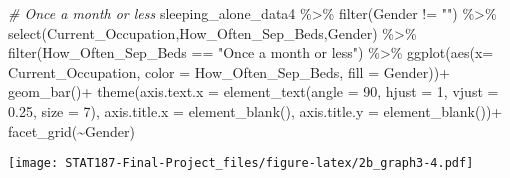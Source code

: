 \documentclass[
]{article}
\newenvironment{Shaded}{\begin{snugshade}}{\end{snugshade}}
\newcommand{\AttributeTok}[1]{\textcolor[rgb]{0.77,0.63,0.00}{#1}}
\newcommand{\CommentTok}[1]{\textcolor[rgb]{0.56,0.35,0.01}{\textit{#1}}}
\newcommand{\DecValTok}[1]{\textcolor[rgb]{0.00,0.00,0.81}{#1}}
\newcommand{\FloatTok}[1]{\textcolor[rgb]{0.00,0.00,0.81}{#1}}
\newcommand{\FunctionTok}[1]{\textcolor[rgb]{0.00,0.00,0.00}{#1}}
\newcommand{\NormalTok}[1]{#1}
\newcommand{\SpecialCharTok}[1]{\textcolor[rgb]{0.00,0.00,0.00}{#1}}
\newcommand{\StringTok}[1]{\textcolor[rgb]{0.31,0.60,0.02}{#1}}
\begin{document}
\begin{Shaded}
\begin{Highlighting}[]
\CommentTok{\# Once a month or less}
\NormalTok{sleeping\_alone\_data4 }\SpecialCharTok{\%\textgreater{}\%} \FunctionTok{filter}\NormalTok{(Gender }\SpecialCharTok{!=} \StringTok{""}\NormalTok{) }\SpecialCharTok{\%\textgreater{}\%}
  \FunctionTok{select}\NormalTok{(Current\_Occupation,How\_Often\_Sep\_Beds,Gender) }\SpecialCharTok{\%\textgreater{}\%}
  \FunctionTok{filter}\NormalTok{(How\_Often\_Sep\_Beds }\SpecialCharTok{==} \StringTok{"Once a month or less"}\NormalTok{) }\SpecialCharTok{\%\textgreater{}\%}
  \FunctionTok{ggplot}\NormalTok{(}\FunctionTok{aes}\NormalTok{(}\AttributeTok{x=}\NormalTok{ Current\_Occupation,}
             \AttributeTok{color =}\NormalTok{ How\_Often\_Sep\_Beds,}
             \AttributeTok{fill =}\NormalTok{ Gender))}\SpecialCharTok{+}
  \FunctionTok{geom\_bar}\NormalTok{()}\SpecialCharTok{+}
  \FunctionTok{theme}\NormalTok{(}\AttributeTok{axis.text.x =} \FunctionTok{element\_text}\NormalTok{(}\AttributeTok{angle =} \DecValTok{90}\NormalTok{,}
                                   \AttributeTok{hjust =} \DecValTok{1}\NormalTok{,}
                                   \AttributeTok{vjust =} \FloatTok{0.25}\NormalTok{,}
                                   \AttributeTok{size =} \DecValTok{7}\NormalTok{),}
        \AttributeTok{axis.title.x =} \FunctionTok{element\_blank}\NormalTok{(),}
        \AttributeTok{axis.title.y =} \FunctionTok{element\_blank}\NormalTok{())}\SpecialCharTok{+}
  \FunctionTok{facet\_grid}\NormalTok{(}\SpecialCharTok{\textasciitilde{}}\NormalTok{Gender)}
\end{Highlighting}
\end{Shaded}

\texttt{[image: STAT187-Final-Project\_files/figure-latex/2b\_graph3-4.pdf]}
\end{document}
